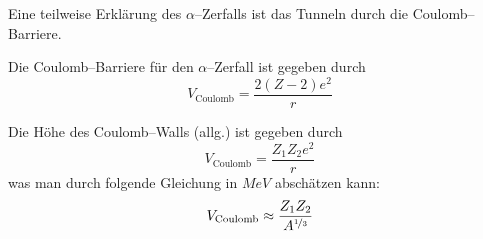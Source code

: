 \documentclass[Ex4_Zusammenfassung.tex]{subfiles}
\begin{document}
 Eine teilweise Erklärung des $\alpha$--Zerfalls ist das Tunneln durch die Coulomb--Barriere. 
 
 
 Die Coulomb--Barriere für den $\alpha$--Zerfall ist gegeben durch
 \begin{equation}
	 V_{\text{Coulomb}} = \frac{2(Z-2) e^2}{r}
 \end{equation}
 
 Die Höhe des Coulomb--Walls (allg.) ist gegeben durch
 \begin{equation}
	 V_{\text{Coulomb}} = \frac{Z_1 Z_2 e^2}{r}
 \end{equation}
 was man durch folgende Gleichung in $\si{MeV}$ abschätzen kann:
 \begin{equation}
	 V_{\text{Coulomb}} \approx \frac{Z_1 Z_2}{A^{\nicefrac{1}{3}}}
 \end{equation}
\end{document}
